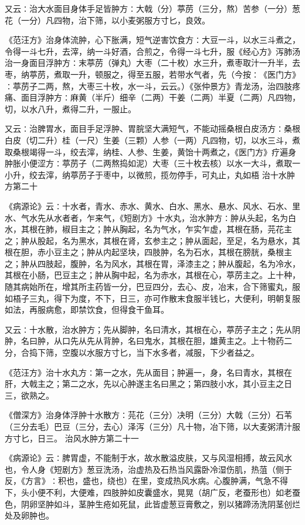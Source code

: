 \documentclass[a4paper,12pt,UTF8,twoside]{ctexbook}
\begin{document}
又云∶治大水面目身体手足皆肿方∶大戟（分）葶苈（三分，熬）苦参（一分）葱花（一分）凡四物，治下筛，以小麦粥服方寸匕，良效。

《范汪方》治身体流肿，心下胀满，短气逆害饮食方∶大豆一斗，以水三斗煮之，令得一斗七升，去滓，纳一斗好酒，合煎之，令得一斗七升，服《经心方》泻肺汤治一身面目浮肿方∶末葶苈（弹丸）大枣（二十枚）水三升，煮枣取汁一升半，去枣，纳葶苈，煮取一升，顿服之，得至五服，若带水气者，先（今按∶《医门方》∶葶苈子二两，熬，大枣三十枚，水一斗，云云。）《张仲景方》青龙汤，治四肢疼痛、面目浮肿方∶麻黄（半斤）细辛（二两）干姜（二两）半夏（二两）凡四物，切，以水八升，煮得二升，一服止。

又云∶治脾胃水，面目手足浮肿、胃脘坚大满短气，不能动摇桑根白皮汤方∶桑根白皮（切二升）桂（一尺）生姜（三颗）人参（一两）凡四物，切，以水三斗，煮取桑根竭得一斗，绞去滓，纳桂、人参、生姜，黄饴十两煮之，《医门方》疗遍身肿胀小便涩方∶葶苈子（二两熬捣如泥）大枣（三十枚去核）以水一大斗，煮取一小升，绞去滓，纳葶苈子于枣中，以微煎，揽勿停手，可丸止，丸如梧
治十水肿方第二十

《病源论》云∶十水者，青水、赤水、黄水、白水、黑水、悬水、风水、石水、里水、气水先从水者者，乍来气，《短剧方》十水丸，治水肿方∶肿从头起，名为白水，其根在肺，椒目主之；肿从胸起，名为气水，乍实乍虚，其根在肠，芫花主之；肿从股起，名为黑水，其根在肾，玄参主之；肿从面起，至足，名为悬水，其根在胆，赤小豆主之；肿从内起坚块，四肢肿，名为石水，其根在膀胱，桑根主之；肿从四肢起，腹肿，名为风水，其根在胃，泽漆主之；肿从腹起，名为冷水，其根在小肠，巴豆主之；肿从胸中起，名为赤水，其根在心，葶苈主之。上十种，随其病始所在，增其所主药皆一分，巴豆四分，去心、皮，冶末，合下筛蜜丸，服如梧子三丸，得下为度，不下，日三，亦可作散末食服半钱匕，大便利，明朝复服如法，再服病愈，即禁饮食，但得食干鱼耳。

又云∶十水散，治水肿方；先从脚肿，名曰清水，其根在心，葶苈子主之；先从阴肿，名曰肿，从口先从先从背肿，名曰鬼水，其根在胆，雄黄主之。上十物药二分，合捣下筛，空腹以水服方寸匕，当下水多者，减服，下少者益之。

《范汪方》治十水丸方∶第一之水，先从面目；肿遍一，身，名曰青水，其根在肝，大戟主之；第二之水，先以心肿遂主名曰黑之；第四肢小水，其小豆主之日三，欲熟之。

《僧深方》治身体浮肿十水散方∶芫花（三分）决明（三分）大戟（三分）石苇（三分去毛）巴豆（三分，去心）泽泻（三分）凡十物，冶下筛，以大麦粥清汁服方寸匕，日三。
治风水肿方第二十一

《病源论》云∶脾胃虚，不能制于水，故水散溢皮肤，又与风湿相搏，故云风水也，令人身《短剧方》葱豆洗汤，治虚热及石热当风露卧冷湿伤肌，热菹（侧于反，《方言》∶积也，盛也，绕也）在里，变成热风水病。心腹肿满，气急不得下，头小便不利，大便难，四肢肿如皮囊盛水，晃晃（胡广反，老蚕形也）如老蚕色，阴卵坚肿如斗，茎肿生疮如死鼠，此皆虚葱豆膏敷之，别以猪蹄汤洗阴茎创烂处及卵肿也。
\end{document}
